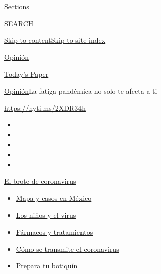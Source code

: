 Sections

SEARCH

\protect\hyperlink{site-content}{Skip to
content}\protect\hyperlink{site-index}{Skip to site index}

\href{https://www.nytimes.com/es/section/opinion}{Opinión}

\href{https://myaccount.nytimes.com/auth/login?response_type=cookie\&client_id=vi}{}

\href{https://www.nytimes.com/section/todayspaper}{Today's Paper}

\href{/es/section/opinion}{Opinión}\textbar{}La fatiga pandémica no solo
te afecta a ti

\href{https://nyti.ms/2XDR34h}{https://nyti.ms/2XDR34h}

\begin{itemize}
\item
\item
\item
\item
\item
\end{itemize}

\href{https://www.nytimes.com/es/spotlight/coronavirus?action=click\&pgtype=Article\&state=default\&region=TOP_BANNER\&context=storylines_menu}{El
brote de coronavirus}

\begin{itemize}
\tightlist
\item
  \href{https://www.nytimes.com/es/interactive/2020/espanol/america-latina/coronavirus-en-mexico.html?action=click\&pgtype=Article\&state=default\&region=TOP_BANNER\&context=storylines_menu}{Mapa
  y casos en México}
\item
  \href{https://www.nytimes.com/es/2020/07/31/espanol/ciencia-y-tecnologia/ninos-contagio-coronavirus.html?action=click\&pgtype=Article\&state=default\&region=TOP_BANNER\&context=storylines_menu}{Los
  niños y el virus}
\item
  \href{https://www.nytimes.com/es/interactive/2020/science/coronavirus-tratamientos-curas.html?action=click\&pgtype=Article\&state=default\&region=TOP_BANNER\&context=storylines_menu}{Fármacos
  y tratamientos}
\item
  \href{https://www.nytimes.com/es/2020/07/06/espanol/ciencia-y-tecnologia/coronavirus-transmision-aire.html?action=click\&pgtype=Article\&state=default\&region=TOP_BANNER\&context=storylines_menu}{Cómo
  se transmite el coronavirus}
\item
  \href{https://www.nytimes.com/es/2020/07/14/espanol/estilos-de-vida/botiquin-medicina-coronavirus.html?action=click\&pgtype=Article\&state=default\&region=TOP_BANNER\&context=storylines_menu}{Prepara
  tu botiquín}
\end{itemize}

